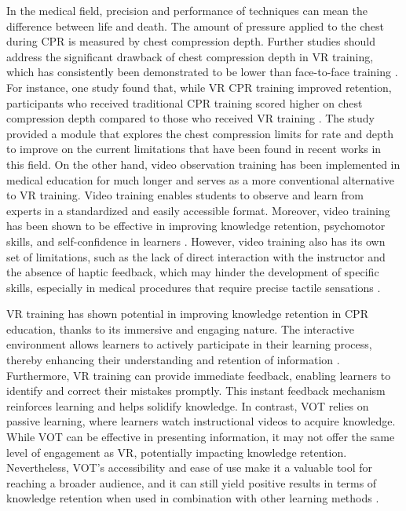 \documentclass[manuscript]{./Models/acmart}
\begin{document}
In the medical field, precision and performance of techniques can mean the difference between life and death. The amount of pressure applied to the chest during CPR is measured by chest compression depth. Further studies should address the significant drawback of chest compression depth in VR training, which has consistently been demonstrated to be lower than face-to-face training \cite{nas-2020}. For instance, one study found that, while VR CPR training improved retention, participants who received traditional CPR training scored higher on chest compression depth compared to those who received VR training \cite{nas-2021}. The study provided a module that explores the chest compression limits for rate and depth to improve on the current limitations that have been found in recent works in this field. On the other hand, video observation training has been implemented in medical education for much longer and serves as a more conventional alternative to VR training. Video training enables students to observe and learn from experts in a standardized and easily accessible format. Moreover, video training has been shown to be effective in improving knowledge retention, psychomotor skills, and self-confidence in learners \cite{almousa-2019, pottle-2019, creutzfeldt-2016,niles-2009}. However, video training also has its own set of limitations, such as the lack of direct interaction with the instructor and the absence of haptic feedback, which may hinder the development of specific skills, especially in medical procedures that require precise tactile sensations \cite{andreatta-2011, saidu-2023}.

VR training has shown potential in improving knowledge retention in CPR education, thanks to its immersive and engaging nature. The interactive environment allows learners to actively participate in their learning process, thereby enhancing their understanding and retention of information \cite{almousa-2019, pottle-2019, creutzfeldt-2016}. Furthermore, VR training can provide immediate feedback, enabling learners to identify and correct their mistakes promptly. This instant feedback mechanism reinforces learning and helps solidify knowledge. In contrast, VOT relies on passive learning, where learners watch instructional videos to acquire knowledge. While VOT can be effective in presenting information, it may not offer the same level of engagement as VR, potentially impacting knowledge retention. Nevertheless, VOT's accessibility and ease of use make it a valuable tool for reaching a broader audience, and it can still yield positive results in terms of knowledge retention when used in combination with other learning methods \cite{braslow-1997, paglino-2019,saidu-2023}.
\end{document}
